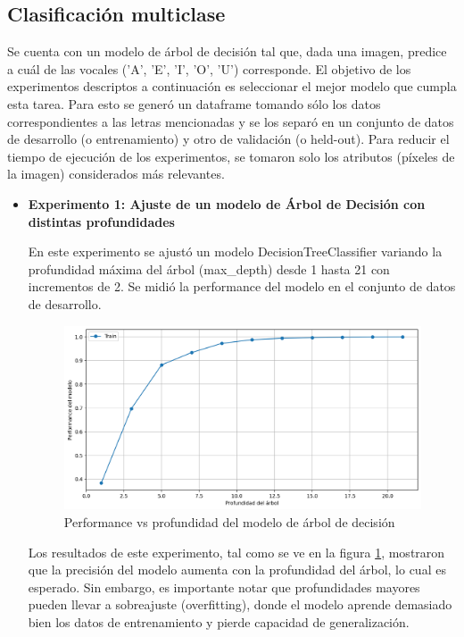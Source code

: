 \documentclass[11pt,a4paper, twocolumn]{article}
\begin{document}
\subsection{Clasificación multiclase}
Se cuenta con un modelo de árbol de decisión tal que, dada una imagen, predice a cuál de las vocales ('A', 'E', 'I', 'O', 'U') corresponde. El objetivo de los experimentos descriptos a continuación es seleccionar el mejor modelo que cumpla esta tarea. Para esto se generó un dataframe tomando sólo los datos correspondientes a las letras mencionadas y se los separó en un conjunto de datos de desarrollo (o entrenamiento) y otro de validación (o held-out). Para reducir el tiempo de ejecución de los experimentos, se tomaron solo los atributos (píxeles de la imagen) considerados más relevantes.

\begin{itemize}
	\item[]
		\textbf{Experimento 1: Ajuste de un modelo de Árbol de Decisión con distintas profundidades}

En este experimento se ajustó un modelo DecisionTreeClassifier variando la profundidad máxima del árbol (max\_depth) desde 1 hasta 21 con incrementos de 2. Se midió la performance del modelo en el conjunto de datos de desarrollo.

\begin{figure}[H]
	\centering
	\includegraphics[scale=0.6]{figuras/3b.png}
	\caption{Performance vs profundidad del modelo de árbol de decisión}
	\label{fig:3b}
\end{figure}

Los resultados de este experimento, tal como se ve en la figura \ref{fig:3b}, mostraron que la precisión del modelo aumenta con la profundidad del árbol, lo cual es esperado. Sin embargo, es importante notar que profundidades mayores pueden llevar a sobreajuste (overfitting), donde el modelo aprende demasiado bien los datos de entrenamiento y pierde capacidad de generalización. 


\end{itemize}
\end{document}
